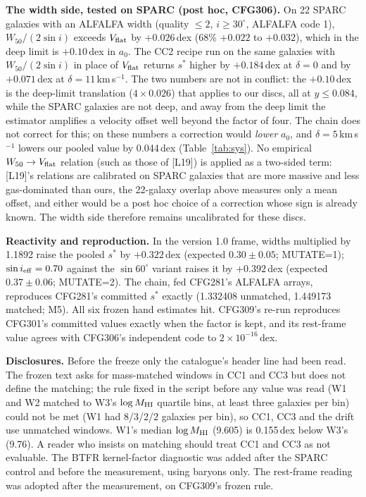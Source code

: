 \documentclass[10pt]{article}
\begin{document}
\textbf{The width side, tested on SPARC (post hoc, CFG306).} On 22 SPARC galaxies with an ALFALFA width (quality $\le2$, $i\ge30^\circ$, ALFALFA code 1), $W_{50}/(2\sin i)$ exceeds $V_{\rm flat}$ by $+0.026$\,dex (68\% $+0.022$ to $+0.032$), which in the deep limit is $+0.10$\,dex in $a_0$. The CC2 recipe run on the same galaxies with $W_{50}/(2\sin i)$ in place of $V_{\rm flat}$ returns $s^*$ higher by $+0.184$\,dex at $\delta=0$ and by $+0.071$\,dex at $\delta=11$\,km\,s$^{-1}$. The two numbers are not in conflict: the $+0.10$\,dex is the deep-limit translation ($4\times0.026$) that applies to our discs, all at $y\le0.084$, while the SPARC galaxies are not deep, and away from the deep limit the estimator amplifies a velocity offset well beyond the factor of four. The chain does not correct for this; on these numbers a correction would \emph{lower} $a_0$, and $\delta=5$\,km\,s$^{-1}$ lowers our pooled value by 0.044\,dex (Table~\ref{tab:sys}). No empirical $W_{50}\to V_{\rm flat}$ relation (such as those of [L19]) is applied as a two-sided term: [L19]'s relations are calibrated on SPARC galaxies that are more massive and less gas-dominated than ours, the 22-galaxy overlap above measures only a mean offset, and either would be a post hoc choice of a correction whose sign is already known. The width side therefore remains uncalibrated for these discs.

\textbf{Reactivity and reproduction.} In the version 1.0 frame, widths multiplied by 1.1892 raise the pooled $s^*$ by $+0.322$\,dex (expected $0.30\pm0.05$; MUTATE=1); $\sin i_{\rm eff}=0.70$ against the $\sin60^\circ$ variant raises it by $+0.392$\,dex (expected $0.37\pm0.06$; MUTATE=2). The chain, fed CFG281's ALFALFA arrays, reproduces CFG281's committed $s^*$ exactly (1.332408 unmatched, 1.449173 matched; M5). All six frozen hand estimates hit. CFG309's re-run reproduces CFG301's committed values exactly when the factor is kept, and its rest-frame value agrees with CFG306's independent code to $2\times10^{-16}$\,dex.

\textbf{Disclosures.} Before the freeze only the catalogue's header line had been read. The frozen text asks for mass-matched windows in CC1 and CC3 but does not define the matching; the rule fixed in the script before any value was read (W1 and W2 matched to W3's $\log M_{\rm HI}$ quartile bins, at least three galaxies per bin) could not be met (W1 had 8/3/2/2 galaxies per bin), so CC1, CC3 and the drift use unmatched windows. W1's median $\log M_{\rm HI}$ (9.605) is 0.155\,dex below W3's (9.76). A reader who insists on matching should treat CC1 and CC3 as not evaluable. The BTFR kernel-factor diagnostic was added after the SPARC control and before the measurement, using baryons only. The rest-frame reading was adopted after the measurement, on CFG309's frozen rule.
\end{document}
